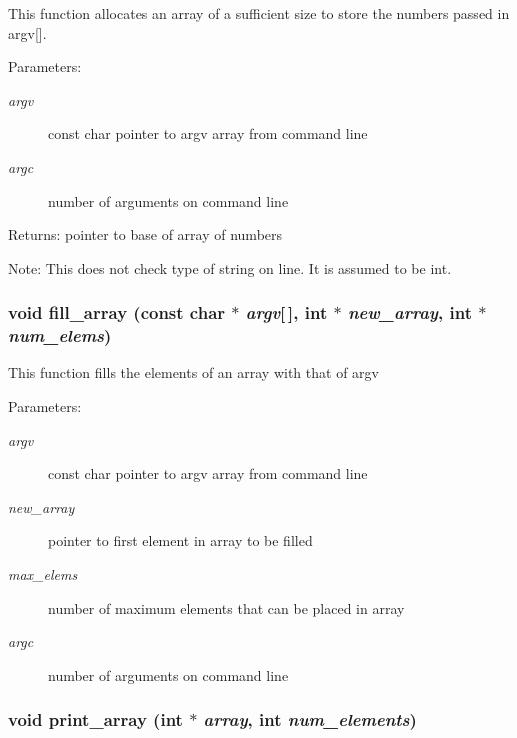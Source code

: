 This function allocates an array of a sufficient size to store the numbers passed in argv[]. \begin{Desc}
\item[Parameters:]
\begin{description}
\item[{\em argv}]const char pointer to argv array from command line \item[{\em argc}]number of arguments on command line \end{description}
\end{Desc}
\begin{Desc}
\item[Returns:]pointer to base of array of numbers \end{Desc}
\begin{Desc}
\item[Note:]This does not check type of string on line. It is assumed to be int. \end{Desc}
\subsubsection{\setlength{\rightskip}{0pt plus 5cm}void fill\_\-array (const char $\ast$ {\em argv}[$\,$], int $\ast$ {\em new\_\-array}, int $\ast$ {\em num\_\-elems})}\label{sort_8c_710b7ff37ab6f6ab4ccce28c0f6b8c48}


This function fills the elements of an array with that of argv \begin{Desc}
\item[Parameters:]
\begin{description}
\item[{\em argv}]const char pointer to argv array from command line \item[{\em new\_\-array}]pointer to first element in array to be filled \item[{\em max\_\-elems}]number of maximum elements that can be placed in array \item[{\em argc}]number of arguments on command line \end{description}
\end{Desc}
\subsubsection{\setlength{\rightskip}{0pt plus 5cm}void print\_\-array (int $\ast$ {\em array}, int {\em num\_\-elements})}\label{sort_8c_8d05914dfc431857377538709fc5d8a2}


